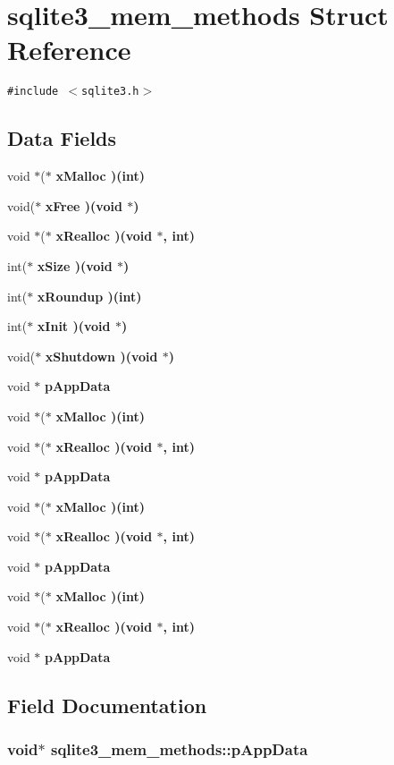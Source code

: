 \section{sqlite3\_\-mem\_\-methods Struct Reference}
\label{structsqlite3__mem__methods}
{\tt \#include $<$sqlite3.h$>$}

\subsection*{Data Fields}
\begin{CompactItemize}
\item 
void $\ast$($\ast$ \bf{x\-Malloc} )(int)
\item 
void($\ast$ \bf{x\-Free} )(void $\ast$)
\item 
void $\ast$($\ast$ \bf{x\-Realloc} )(void $\ast$, int)
\item 
int($\ast$ \bf{x\-Size} )(void $\ast$)
\item 
int($\ast$ \bf{x\-Roundup} )(int)
\item 
int($\ast$ \bf{x\-Init} )(void $\ast$)
\item 
void($\ast$ \bf{x\-Shutdown} )(void $\ast$)
\item 
void $\ast$ \bf{p\-App\-Data}
\item 
void $\ast$($\ast$ \bf{x\-Malloc} )(int)
\item 
void $\ast$($\ast$ \bf{x\-Realloc} )(void $\ast$, int)
\item 
void $\ast$ \bf{p\-App\-Data}
\item 
void $\ast$($\ast$ \bf{x\-Malloc} )(int)
\item 
void $\ast$($\ast$ \bf{x\-Realloc} )(void $\ast$, int)
\item 
void $\ast$ \bf{p\-App\-Data}
\item 
void $\ast$($\ast$ \bf{x\-Malloc} )(int)
\item 
void $\ast$($\ast$ \bf{x\-Realloc} )(void $\ast$, int)
\item 
void $\ast$ \bf{p\-App\-Data}
\end{CompactItemize}


\subsection{Field Documentation}
\subsubsection{\setlength{\rightskip}{0pt plus 5cm}void$\ast$ \bf{sqlite3\_\-mem\_\-methods::p\-App\-Data}}\label{structsqlite3__mem__methods_945ab6831ae6e0286982d2f1890bd389}


